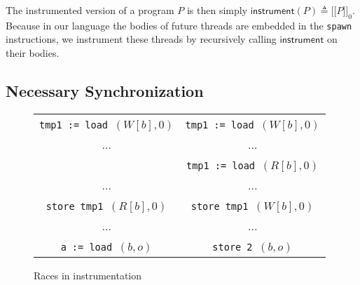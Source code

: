 \documentclass[preprint, 10pt]{sigplanconf}
\newcommand{\meanl}{\ensuremath{[ \! [}}
\newcommand{\meanr}{\ensuremath{] \! ]}}
\newcommand{\means}[1]{\ensuremath{\meanl #1 \meanr}}
\newcommand{\load}[2]{#1\ \texttt{:= load}\ #2}
\newcommand{\store}[2]{\texttt{store}\ #2\ #1}
\newcommand{\instr}[2]{\ensuremath{\means{#2}_{#1}}}
\newcommand{\instrp}[1]{\ensuremath{\mathsf{instrument}(#1)}}
\begin{document}
The instrumented version of a program $P$ is then simply $\instrp{P} \triangleq \instr{0}{P}$. Because in our language the bodies of future threads are embedded in the \texttt{spawn} instructions, we instrument these threads by recursively calling $\mathsf{instrument}$ on their bodies.

\subsection{Necessary Synchronization}
\label{sync}

\begin{figure}[htb]
\centering
\begin{tabular}{c || c}
\load{\texttt{tmp1}}{$(W[b], 0)$} & \load{\texttt{tmp1}}{$(W[b], 0)$}\\
... & ...\\
& \load{\texttt{tmp1}}{$(R[b], 0)$}\\
... & ...\\
\store{$(R[b], 0)$}{\texttt{tmp1}} & \store{$(W[b], 0)$}{\texttt{tmp1}}\\
... & ...\\
\load{\texttt{a}}{$(b, o)$} & \store{$(b, o)$}{\texttt{2}}
\end{tabular}

\caption{Races in instrumentation}
\label{instr-race}
\end{figure}
\end{document}
